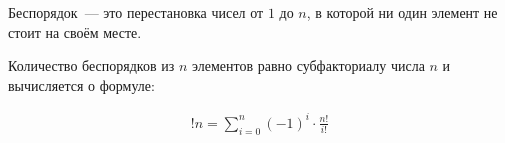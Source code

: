 \begin{definition}
  Беспорядок~--- это перестановка чисел от \(1\) до \(n\), в которой ни один
  элемент не стоит на своём месте.
\end{definition}

\begin{theorem}
  Количество беспорядков из \(n\) элементов равно субфакториалу числа \(n\) и
  вычисляется о формуле:
  
  \begin{align*}
    !n = \sum_{i = 0}^{n} (-1)^{i} \cdot \frac{n!}{i!}
  \end{align*}
\end{theorem}
